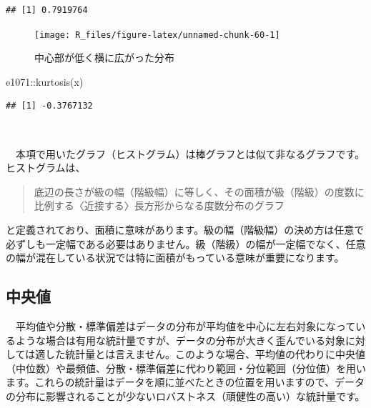 \documentclass[
  12pt,
]{book}
\newenvironment{Shaded}{\begin{snugshade}}{\end{snugshade}}
\newcommand{\FunctionTok}[1]{\textcolor[rgb]{0.00,0.00,0.00}{#1}}
\newcommand{\NormalTok}[1]{#1}
\newcommand{\SpecialCharTok}[1]{\textcolor[rgb]{0.00,0.00,0.00}{#1}}
\begin{document}
\begin{verbatim}
## [1] 0.7919764
\end{verbatim}

\begin{figure}[H]

{\centering \texttt{[image: R\_files/figure-latex/unnamed-chunk-60-1]} 

}

\caption{中心部が低く横に広がった分布}\label{fig:unnamed-chunk-60}
\end{figure}

\begin{Shaded}
\begin{Highlighting}[numbers=left,,]
\NormalTok{e1071}\SpecialCharTok{::}\FunctionTok{kurtosis}\NormalTok{(x)}
\end{Highlighting}
\end{Shaded}

\begin{verbatim}
## [1] -0.3767132
\end{verbatim}

　

\begin{hint-box}
　本項で用いたグラフ（ヒストグラム）は棒グラフとは似て非なるグラフです。ヒストグラムは、

\begin{quote}
底辺の長さが級の幅（階級幅）に等しく、その面積が級（階級）の度数に比例する〈近接する〉長方形からなる度数分布のグラフ
\end{quote}

と定義されており、面積に意味があります。級の幅（階級幅）の決め方は任意で必ずしも一定幅である必要はありません。級（階級）の幅が一定幅でなく、任意の幅が混在している状況では特に面積がもっている意味が重要になります。

\end{hint-box}

\newpage

\hypertarget{ux4e2dux592eux5024}{%
\subsection{\texorpdfstring{中央値}{中央値}}\label{ux4e2dux592eux5024}}

　平均値や分散・標準偏差はデータの分布が平均値を中心に左右対象になっているような場合は有用な統計量ですが、データの分布が大きく歪んでいる対象に対しては適した統計量とは言えません。このような場合、平均値の代わりに中央値（中位数）や最頻値、分散・標準偏差に代わり範囲・分位範囲（分位値）を用います。これらの統計量はデータを順に並べたときの位置を用いますので、データの分布に影響されることが少ないロバストネス（頑健性の高い）な統計量です。
\end{document}
